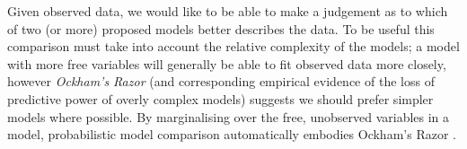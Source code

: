 Given observed data, we would like to be able to make a judgement as to which of two (or more) proposed models better describes the data. To be useful this comparison must take into account the relative complexity of the models; a model with more free variables will generally be able to fit observed data more closely, however \emph{Ockham's Razor} (and corresponding empirical evidence of the loss of predictive power of overly complex models) suggests we should prefer simpler models where possible. By marginalising over the free,  unobserved variables in a model, probabilistic model comparison automatically embodies Ockham's Razor \citep{mackay2003information}. 


